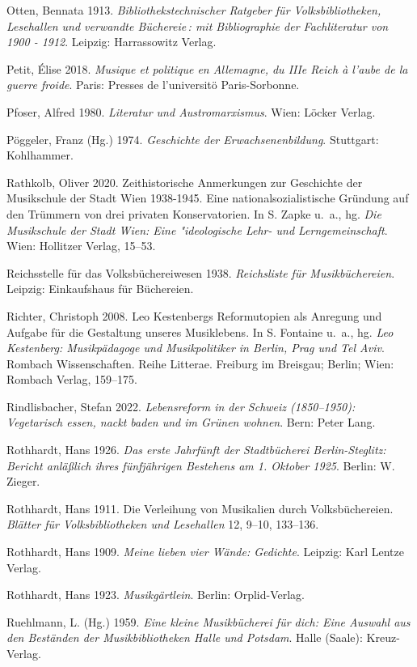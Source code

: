 \documentclass[a4paper,
fontsize=11pt,
oneside,
numbers=noperiodatend,
parskip=half-,
bibliography=totoc,
final
]{scrartcl}
\begin{document}
Otten, Bennata 1913. \emph{Bibliothekstechnischer Ratgeber für
Volksbibliotheken, Lesehallen und verwandte Büchereie\,: mit
Bibliographie der Fachliteratur von 1900 - 1912}. Leipzig: Harrassowitz
Verlag.

Petit, Élise 2018. \emph{Musique et politique en Allemagne, du IIIe
Reich à l'aube de la guerre froide}. Paris: Presses de l'universitö
Paris-Sorbonne.

Pfoser, Alfred 1980. \emph{Literatur und Austromarxismus}. Wien: Löcker
Verlag.

Pöggeler, Franz (Hg.) 1974. \emph{Geschichte der Erwachsenenbildung}.
Stuttgart: Kohlhammer.

Rathkolb, Oliver 2020. Zeithistorische Anmerkungen zur Geschichte der
Musikschule der Stadt Wien 1938-1945. Eine nationalsozialistische
Gründung auf den Trümmern von drei privaten Konservatorien. In S. Zapke
u.~a., hg. \emph{Die Musikschule der Stadt Wien: Eine "ideologische
Lehr- und Lerngemeinschaft}. Wien: Hollitzer Verlag, 15--53.

Reichsstelle für das Volksbüchereiwesen 1938. \emph{Reichsliste für
Musikbüchereien}. Leipzig: Einkaufshaus für Büchereien.

Richter, Christoph 2008. Leo Kestenbergs Reformutopien als Anregung und
Aufgabe für die Gestaltung unseres Musiklebens. In S. Fontaine u.~a.,
hg. \emph{Leo Kestenberg: Musikpädagoge und Musikpolitiker in Berlin,
Prag und Tel Aviv}. Rombach Wissenschaften. Reihe Litterae. Freiburg im
Breisgau; Berlin; Wien: Rombach Verlag, 159--175.

Rindlisbacher, Stefan 2022. \emph{Lebensreform in der Schweiz
(1850--1950): Vegetarisch essen, nackt baden und im Grünen wohnen}.
Bern: Peter Lang.

Rothhardt, Hans 1926. \emph{Das erste Jahrfünft der Stadtbücherei
Berlin-Steglitz: Bericht anläßlich ihres fünfjährigen Bestehens am 1.
Oktober 1925}. Berlin: W. Zieger.

Rothhardt, Hans 1911. Die Verleihung von Musikalien durch
Volksbüchereien. \emph{Blätter für Volksbibliotheken und Lesehallen} 12,
9--10, 133--136.

Rothhardt, Hans 1909. \emph{Meine lieben vier Wände: Gedichte}. Leipzig:
Karl Lentze Verlag.

Rothhardt, Hans 1923. \emph{Musikgärtlein}. Berlin: Orplid-Verlag.

Ruehlmann, L. (Hg.) 1959. \emph{Eine kleine Musikbücherei für dich: Eine
Auswahl aus den Beständen der Musikbibliotheken Halle und Potsdam}.
Halle (Saale): Kreuz-Verlag.
\end{document}
